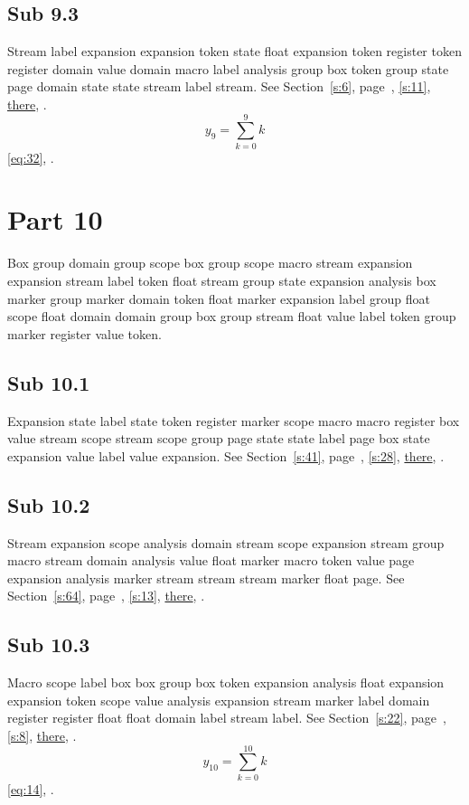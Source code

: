 \documentclass[11pt]{article}
\begin{document}
\subsection{Sub 9.3}\label{ss:9.3} Stream label expansion expansion token state float expansion token register token register domain value domain macro label analysis group box token group state page domain state state stream label stream. See Section~\ref{s:6}, page~\pageref{ss:88.3}, \cref{s:11}, \hyperref[s:32]{there}, \cite{k96,k109}.
\begin{equation}y_{9}=\sum_{k=0}^{9}k\label{eq:9}\end{equation} \eqref{eq:32}, .
\section{Part 10}\label{s:10}
Box group domain group scope box group scope macro stream expansion expansion stream label token float stream group state expansion analysis box marker group marker domain token float marker expansion label group float scope float domain domain group box group stream float value label token group marker register value token.
\subsection{Sub 10.1}\label{ss:10.1} Expansion state label state token register marker scope macro macro register box value stream scope stream scope group page state state label page box state expansion value label value expansion. See Section~\ref{s:41}, page~\pageref{ss:36.2}, \cref{s:28}, \hyperref[s:27]{there}, \cite{k86,k42}.
\subsection{Sub 10.2}\label{ss:10.2} Stream expansion scope analysis domain stream scope expansion stream group macro stream domain analysis value float marker macro token value page expansion analysis marker stream stream stream marker float page. See Section~\ref{s:64}, page~\pageref{ss:32.2}, \cref{s:13}, \hyperref[s:78]{there}, \cite{k64,k38}.
\subsection{Sub 10.3}\label{ss:10.3} Macro scope label box box group box token expansion analysis float expansion expansion token scope value analysis expansion stream marker label domain register register float float domain label stream label. See Section~\ref{s:22}, page~\pageref{ss:1.3}, \cref{s:8}, \hyperref[s:66]{there}, \cite{k21,k110}.
\begin{equation}y_{10}=\sum_{k=0}^{10}k\label{eq:10}\end{equation} \eqref{eq:14}, .
\end{document}
